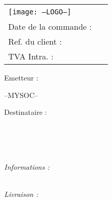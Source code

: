\documentclass[a4paper, oneside, 10pt, french]{article}
\begin{document}
\begin{tabularx}{\textwidth}{X X}
    \vspace{0pt} 
    \texttt{[image: --LOGO--]}
    & 
    \vspace{0pt}
   \raggedleft
	\textcolor{violet}{\textsc{\Large \jsonTitleValue \  \jsonRefValue}}\\
	Date de la commande : \jsonDatecValue\\
	Ref. du client : \jsonRefClientValue\\
	TVA Intra. : \jsonToValueTva \\
\end{tabularx}


\begin{minipage}[t]{0.40\textwidth}
{\small Emetteur :}\\
\begin{fminipage}
--MYSOC--
\end{fminipage}
\end{minipage}
\hspace{1cm}
\begin{minipage}[t]{0.52\textwidth}
{\small Destinataire :}

\begin{fminipage}
\textbf{\large \jsonToValueName}\\
\jsonToValueAddressStreet\\
\textsc{\jsonToValueAddressZip \ \jsonToValueAddressCity}\\
\begin{minipage}{\textwidth}
\flushright
{\tiny \jsonToValueCodeClient}
\end{minipage}
\end{fminipage}
\end{minipage}

\begin{minipage}[t]{0.60\textwidth}
{\small \it Informations :}\\
\jsonNotesValue \\
\end{minipage}
\hspace{1cm}
\begin{minipage}[t]{0.32\textwidth}
\begin{flushright}
{\it Livraison : \jsonDeliveryModeValue}
\end{flushright}
\end{minipage}
\end{document}
